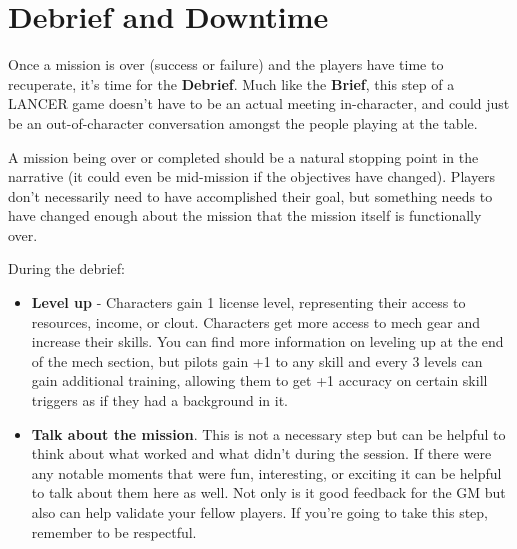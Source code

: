 \section{Debrief and Downtime}

Once a mission is over (success or failure) and the players have time to recuperate, it's time for the \textbf{Debrief}. Much like the \textbf{Brief}, this step of a LANCER game doesn't have to be an actual meeting in-character, and could just be an out-of-character conversation amongst the people playing at the table. 

A mission being over or completed should be a natural stopping point in the narrative (it could even be mid-mission if the objectives have changed). Players don't necessarily need to have accomplished their goal, but something needs to have changed enough about the mission that the mission itself is functionally over. 

During the debrief:
\begin{itemize}
\item \textbf{Level up} - Characters gain 1 license level, representing their access to resources, income, or clout. Characters get more access to mech gear and increase their skills. You can find more information on leveling up at the end of the mech section, but pilots gain +1 to any skill and every 3 levels can gain additional training, allowing them to get +1 accuracy on certain skill triggers as if they had a background in it.
\item \textbf{Talk about the mission}. This is not a necessary step but can be helpful to think about what worked and what didn't during the session. If there were any notable moments that were fun, interesting, or exciting it can be helpful to talk about them here as well. Not only is it good feedback for the GM but also can help validate your fellow players. If you're going to take this step, remember to be respectful.
\end{itemize}  